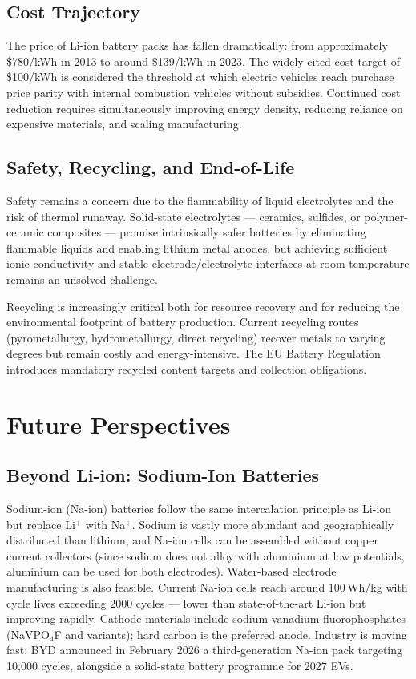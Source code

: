 \subsection{Cost Trajectory}

The price of Li-ion battery packs has fallen dramatically: from approximately \$780/kWh in 2013 to around \$139/kWh in 2023. The widely cited cost target of \$100/kWh is considered the threshold at which electric vehicles reach purchase price parity with internal combustion vehicles without subsidies. Continued cost reduction requires simultaneously improving energy density, reducing reliance on expensive materials, and scaling manufacturing.

\subsection{Safety, Recycling, and End-of-Life}

Safety remains a concern due to the flammability of liquid electrolytes and the risk of thermal runaway. Solid-state electrolytes — ceramics, sulfides, or polymer-ceramic composites — promise intrinsically safer batteries by eliminating flammable liquids and enabling lithium metal anodes, but achieving sufficient ionic conductivity and stable electrode/electrolyte interfaces at room temperature remains an unsolved challenge.

Recycling is increasingly critical both for resource recovery and for reducing the environmental footprint of battery production. Current recycling routes (pyrometallurgy, hydrometallurgy, direct recycling) recover metals to varying degrees but remain costly and energy-intensive. The EU Battery Regulation introduces mandatory recycled content targets and collection obligations.

\section{Future Perspectives}

\subsection{Beyond Li-ion: Sodium-Ion Batteries}

Sodium-ion (Na-ion) batteries follow the same intercalation principle as Li-ion but replace Li$^+$ with Na$^+$. Sodium is vastly more abundant and geographically distributed than lithium, and Na-ion cells can be assembled without copper current collectors (since sodium does not alloy with aluminium at low potentials, aluminium can be used for both electrodes). Water-based electrode manufacturing is also feasible. Current Na-ion cells reach around 100\,Wh/kg with cycle lives exceeding 2000 cycles — lower than state-of-the-art Li-ion but improving rapidly. Cathode materials include sodium vanadium fluorophosphates (NaVPO$_4$F and variants); hard carbon is the preferred anode. Industry is moving fast: BYD announced in February 2026 a third-generation Na-ion pack targeting 10,000 cycles, alongside a solid-state battery programme for 2027 EVs.

